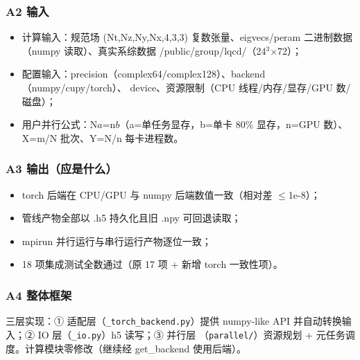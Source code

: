 \documentclass[UTF8]{ctexart}
\begin{document}
\subsubsection{A2 输入}
\begin{itemize}
\item 计算输入：规范场 (Nt,Nz,Ny,Nx,4,3,3) 复数张量、eigvecs/peram
二进制数据（numpy 读取）、真实系综数据 /public/group/lqcd/（24$^3$$\times$72）；
\item 配置输入：precision（complex64/complex128）、backend（numpy/cupy/torch）、
device、资源限制（CPU 线程/内存/显存/GPU 数/磁盘）；
\item 用户并行公式：N$a$=n$b$（a=单任务显存，b=单卡 80\% 显存，n=GPU 数）、
X=m/N 批次、Y=N/n 每卡进程数。
\end{itemize}

\subsubsection{A3 输出（应是什么）}
\begin{itemize}
\item torch 后端在 CPU/GPU 与 numpy 后端数值一致（相对差 $\le$1e-8）；
\item 管线产物全部以 .h5 持久化且旧 .npy 可回退读取；
\item mpirun 并行运行与串行运行产物逐位一致；
\item 18 项集成测试全数通过（原 17 项 + 新增 torch 一致性项）。
\end{itemize}

\subsubsection{A4 整体框架}
三层实现：① 适配层（\texttt{\nolinkurl{_torch_backend.py}}）提供 numpy-like API
并自动转换输入；② IO 层（\texttt{\nolinkurl{_io.py}}）h5 读写；③ 并行层
（\texttt{\nolinkurl{parallel/}}）资源规划 + 元任务调度。计算模块零修改（继续经
get\_backend 使用后端）。
\end{document}
